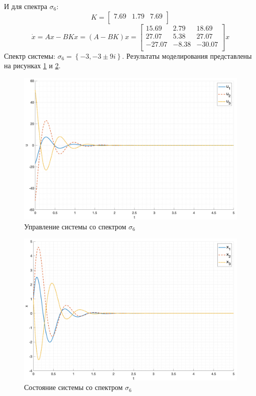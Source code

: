 И для спектра $\sigma_6$:
\begin{equation}
    K = \begin{bmatrix}
        7.69  & 1.79  & 7.69 \\ 
    \end{bmatrix}
\end{equation}
\begin{equation}
    \dot{x} = Ax - BKx = (A - BK)x = \begin{bmatrix}
        15.69  & 2.79  & 18.69 \\ 
        27.07  & 5.38  & 27.07 \\ 
        -27.07  & -8.38  & -30.07 \\ 
    \end{bmatrix}x
\end{equation}
Спектр системы: $\sigma_6 = \left\{ -3, -3\pm9i \right\}$.
Результаты моделирования представлены на рисунках \ref{fig:task1_u_6} и \ref{fig:task1_x_6}.
\begin{figure}[ht!]
    \centering
    \includegraphics[width=\textwidth]{media/plots/task1_u_6.png}
    \caption{Управление системы со спектром $\sigma_6$}
    \label{fig:task1_u_6}
\end{figure}
\begin{figure}
    \centering
    \includegraphics[width=\textwidth]{media/plots/task1_x_6.png}
    \caption{Состояние системы со спектром $\sigma_6$}
    \label{fig:task1_x_6}
\end{figure}

